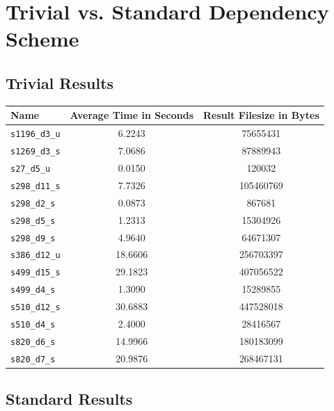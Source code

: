 \chapter{Trivial vs. Standard Dependency Scheme} \label{trivialvsstandardappendix}

\section{Trivial Results}

\begin{center}
\begin{tabular}{| l | c | c |}
\hline
\textbf{Name} & \textbf{Average Time in Seconds} & \textbf{Result Filesize in Bytes} \\ \hline
\texttt{s1196\_d3\_u} & 6.2243 & 75655431 \\
\texttt{s1269\_d3\_s} & 7.0686 & 87889943 \\
\texttt{s27\_d5\_u} & 0.0150 & 120032 \\
\texttt{s298\_d11\_s} & 7.7326 & 105460769 \\
\texttt{s298\_d2\_s} & 0.0873 & 867681 \\
\texttt{s298\_d5\_s} & 1.2313 & 15304926 \\
\texttt{s298\_d9\_s} & 4.9640 & 64671307 \\
\texttt{s386\_d12\_u} & 18.6606 & 256703397 \\
\texttt{s499\_d15\_s} & 29.1823 & 407056522 \\
\texttt{s499\_d4\_s} & 1.3090 & 15289855 \\
\texttt{s510\_d12\_s} & 30.6883 & 447528018 \\
\texttt{s510\_d4\_s} & 2.4000 & 28416567 \\
\texttt{s820\_d6\_s} & 14.9966 & 180183099 \\
\texttt{s820\_d7\_s} & 20.9876 & 268467131 \\
\hline
\end{tabular}
\end{center}

\section{Standard Results}

